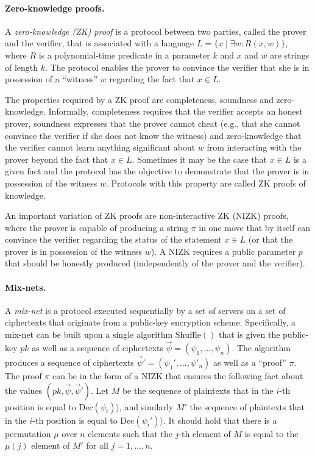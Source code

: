 \paragraph{Zero-knowledge proofs.} A \emph{zero-knowledge (ZK) proof}
is a protocol between two parties, called the prover and the verifier,
that is associated with a language
$L = \{x \mid \exists w : R(x,w)\}$, where $R$ is a polynomial-time
predicate in a parameter $k$ and $x$ and $w$ are strings of length
$k$. The protocol enables the prover to convince the verifier that she
is in possession of a ``witness'' $w$ regarding the fact that
$x\in L$.

The properties required by a ZK proof are completeness, soundness and
zero-knowledge. Informally, completeness requires that the verifier
accepts an honest prover, soundness expresses that the prover cannot
cheat (e.g., that she cannot convince the verifier if she does not
know the witness) and zero-knowledge that the verifier cannot learn
anything significant about $w$ from interacting with the prover beyond
the fact that $x\in L$. Sometimes it may be the case that $x\in L$ is
a given fact and the protocol has the objective to demonstrate that
the prover is in possession of the witness $w$. Protocols with this
property are called ZK proofs of knowledge.

An important variation of ZK proofs are non-interactive ZK (NIZK)
proofs, where the prover is capable of producing a string $\pi$ in one
move that by itself can convince the verifier regarding the status of
the statement $x\in L$ (or that the prover is in possession of the
witness $w$). A NIZK requires a public parameter $p$ that should be
honestly produced (independently of the prover and the verifier).

\paragraph{Mix-nets.} A \emph{mix-net} is a protocol executed
sequentially by a set of servers on a set of ciphertexts that
originate from a public-key encryption scheme. Specifically, a mix-net
can be built upon a single algorithm $\mathrm{Shuffle}()$ that is
given the public-key $pk$ as well as a sequence of ciphertexts
$\vec\psi = (\psi_1,\ldots, \psi_n)$. The algorithm produces a
sequence of ciphertexts $\vec\psi' = (\psi_1', \ldots, \psi'_n)$ as
well as a ``proof'' $\pi$. The proof $\pi$ can be in the form of a
NIZK that ensures the following fact about the values
$(pk, \vec \psi, \vec \psi')$. Let $M$ be the sequence of plaintexts
that in the $i$-th position is equal to
$ \mathrm{Dec}(\psi_i) \rangle$, and similarly $M'$ the sequence of
plaintexts that in the $i$-th position is equal to
$\mathrm{Dec}(\psi_i') \rangle$. It should hold that there is a
permutation $\mu$ over $n$ elements such that the $j$-th element of
$M$ is equal to the $\mu(j)$ element of $M'$ for all $j=1,\ldots, n$.

